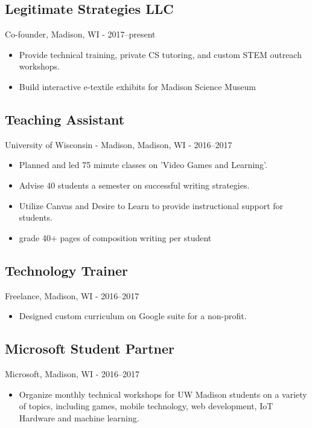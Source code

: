 \documentclass[../main.tex]{subfiles}
\begin{document}
	\subsection*{Legitimate Strategies LLC}
	Co-founder, Madison, WI - 2017--present
	\begin{itemize}
		\item{Provide technical training, private CS tutoring, and custom STEM outreach workshops.}
		\item{Build interactive e-textile exhibits for Madison Science Museum}
	\end{itemize}

	\subsection*{Teaching Assistant}
     University of Wisconsin - Madison, Madison, WI - 2016--2017
	\begin{itemize}
		\item{Planned and led 75 minute classes on 'Video Games and Learning'.}
		\item{Advise 40 students a semester on successful writing strategies.}
		\item{Utilize Canvas and Desire to Learn to provide instructional support for students.}
		\item{grade 40+ pages of composition writing per student}
	\end{itemize}

	\subsection*{Technology Trainer}
     Freelance, Madison, WI - 2016--2017
	\begin{itemize}
		\item{Designed custom curriculum on Google suite for a non-profit.}
	\end{itemize}


	\subsection*{Microsoft Student Partner}
     Microsoft, Madison, WI - 2016--2017
	\begin{itemize}
		\item{Organize monthly technical workshops for UW Madison students on a variety of topics, including games, mobile technology, web development, IoT Hardware and machine learning.}
	\end{itemize}
\end{document}
